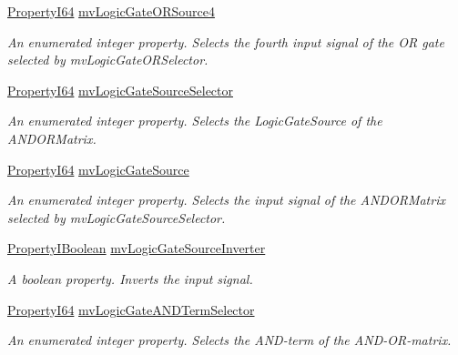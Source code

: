 \begin{DoxyCompactItemize}
\hyperlink{group___common_interface_ga81749b2696755513663492664a18a893}{Property\+I64} \hyperlink{classmv_i_m_p_a_c_t_1_1acquire_1_1_gen_i_cam_1_1mv_logic_gate_control_a6a68bd0cd86529ce32ea5c06401c701e}{mv\+Logic\+Gate\+O\+R\+Source4}
\begin{DoxyCompactList}\small\item\em An enumerated integer property. Selects the fourth input signal of the O\+R gate selected by mv\+Logic\+Gate\+O\+R\+Selector. \end{DoxyCompactList}\item 
\hyperlink{group___common_interface_ga81749b2696755513663492664a18a893}{Property\+I64} \hyperlink{classmv_i_m_p_a_c_t_1_1acquire_1_1_gen_i_cam_1_1mv_logic_gate_control_a2cf94ca87af9ebd46fda681f936d3a11}{mv\+Logic\+Gate\+Source\+Selector}
\begin{DoxyCompactList}\small\item\em An enumerated integer property. Selects the Logic\+Gate\+Source of the A\+N\+D\+O\+R\+Matrix. \end{DoxyCompactList}\item 
\hyperlink{group___common_interface_ga81749b2696755513663492664a18a893}{Property\+I64} \hyperlink{classmv_i_m_p_a_c_t_1_1acquire_1_1_gen_i_cam_1_1mv_logic_gate_control_a6d479832eb171e652ee95de12a1b5117}{mv\+Logic\+Gate\+Source}
\begin{DoxyCompactList}\small\item\em An enumerated integer property. Selects the input signal of the A\+N\+D\+O\+R\+Matrix selected by mv\+Logic\+Gate\+Source\+Selector. \end{DoxyCompactList}\item 
\hyperlink{group___common_interface_ga44f9437e24b21b6c93da9039ec6786aa}{Property\+I\+Boolean} \hyperlink{classmv_i_m_p_a_c_t_1_1acquire_1_1_gen_i_cam_1_1mv_logic_gate_control_ad028a53703d0d80731468d75a55a6071}{mv\+Logic\+Gate\+Source\+Inverter}
\begin{DoxyCompactList}\small\item\em A boolean property. Inverts the input signal. \end{DoxyCompactList}\item 
\hyperlink{group___common_interface_ga81749b2696755513663492664a18a893}{Property\+I64} \hyperlink{classmv_i_m_p_a_c_t_1_1acquire_1_1_gen_i_cam_1_1mv_logic_gate_control_a28bfaafbd816387721c325710151f78d}{mv\+Logic\+Gate\+A\+N\+D\+Term\+Selector}
\begin{DoxyCompactList}\small\item\em An enumerated integer property. Selects the A\+N\+D-\/term of the A\+N\+D-\/\+O\+R-\/matrix. \end{DoxyCompactList}\item 

\end{DoxyCompactItemize}
